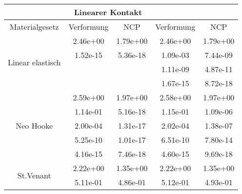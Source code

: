 \begin{table} 
\centering 
\begin{tabular}{c|cc|cc|} 
\cline{2-5} 
 & \multicolumn{2}{|c|}{Linearer Kontakt} &  \\ 
\hline 
\multicolumn{1}{|c|}{Materialgesetz} & \multicolumn{1}{c|}{Verformung} & \multicolumn{1}{c|}{NCP} & \multicolumn{1}{c|}{Verformung} & \multicolumn{1}{c|}{NCP} \\ 
\hline 
\multicolumn{1}{|c|}{\multirow{4}{*}{Linear elastisch}} &\multicolumn{1}{|c|}{  2.46e+00} & \multicolumn{1}{|c|}{  1.79e+00} & \multicolumn{1}{|c|}{  2.46e+00} & \multicolumn{1}{|c|}{  1.79e+00} \\ 
\multicolumn{1}{|c|}{} & \multicolumn{1}{|c|}{  1.52e-15} & \multicolumn{1}{|c|}{  5.36e-18} & \multicolumn{1}{|c|}{  1.09e-03} & \multicolumn{1}{|c|}{  7.44e-09} \\ 
\multicolumn{1}{|c|}{} & \multicolumn{1}{|c|}{} & \multicolumn{1}{|c|}{} & \multicolumn{1}{|c|}{  1.11e-09} & \multicolumn{1}{|c|}{  4.87e-11} \\ 
\multicolumn{1}{|c|}{} & \multicolumn{1}{|c|}{} & \multicolumn{1}{|c|}{} & \multicolumn{1}{|c|}{  1.67e-15} & \multicolumn{1}{|c|}{  8.72e-18} \\ 
\hline 
\multicolumn{1}{|c|}{\multirow{5}{*}{Neo Hooke}} &\multicolumn{1}{|c|}{  2.59e+00} & \multicolumn{1}{|c|}{  1.97e+00} & \multicolumn{1}{|c|}{  2.58e+00} & \multicolumn{1}{|c|}{  1.97e+00} \\ 
\multicolumn{1}{|c|}{} & \multicolumn{1}{|c|}{  1.14e-01} & \multicolumn{1}{|c|}{  5.16e-18} & \multicolumn{1}{|c|}{  1.15e-01} & \multicolumn{1}{|c|}{  1.09e-06} \\ 
\multicolumn{1}{|c|}{} & \multicolumn{1}{|c|}{  2.00e-04} & \multicolumn{1}{|c|}{  1.31e-17} & \multicolumn{1}{|c|}{  2.02e-04} & \multicolumn{1}{|c|}{  1.38e-07} \\ 
\multicolumn{1}{|c|}{} & \multicolumn{1}{|c|}{  5.25e-10} & \multicolumn{1}{|c|}{  1.01e-17} & \multicolumn{1}{|c|}{  6.51e-10} & \multicolumn{1}{|c|}{  7.80e-14} \\ 
\multicolumn{1}{|c|}{} & \multicolumn{1}{|c|}{  4.16e-15} & \multicolumn{1}{|c|}{  7.46e-18} & \multicolumn{1}{|c|}{  4.60e-15} & \multicolumn{1}{|c|}{  9.69e-18} \\ 
\hline 
\multicolumn{1}{|c|}{\multirow{5}{*}{St.Venant}} &\multicolumn{1}{|c|}{  2.22e+00} & \multicolumn{1}{|c|}{  1.35e+00} & \multicolumn{1}{|c|}{  2.22e+00} & \multicolumn{1}{|c|}{  1.35e+00} \\ 
\multicolumn{1}{|c|}{} & \multicolumn{1}{|c|}{  5.11e-01} & \multicolumn{1}{|c|}{  4.86e-01} & \multicolumn{1}{|c|}{  5.12e-01} & \multicolumn{1}{|c|}{  4.93e-01} \\ 

\end{tabular}
\end{table}

